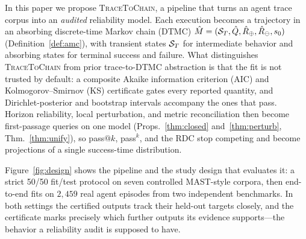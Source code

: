 In this paper we propose \textsc{TraceToChain}, a pipeline that turns an
agent trace corpus into an \emph{audited} reliability model. Each
execution becomes a trajectory in an absorbing discrete-time Markov
chain (DTMC) $\hat M=(\mathcal{S}_T,\hat Q,\hat R_\oplus,\hat R_\ominus,s_0)$
(Definition~\ref{def:amc}), with transient states $\mathcal{S}_T$ for
intermediate behavior and absorbing states for terminal success and
failure. What distinguishes \textsc{TraceToChain}
from prior trace-to-DTMC abstraction is that the fit is not trusted by
default: a composite Akaike information criterion (AIC) and
Kolmogorov--Smirnov (KS) certificate gates every reported quantity, and
Dirichlet-posterior and bootstrap intervals accompany the ones that
pass. Horizon reliability, local perturbation, and metric
reconciliation then become first-passage queries on one model
(Props.~\ref{thm:closed} and~\ref{thm:perturb}, Thm.~\ref{thm:unify}),
so pass$@k$, pass$^k$, and the RDC stop competing and become
projections of a single success-time distribution.

Figure~\ref{fig:design} shows the pipeline and the study design that
evaluates it: a strict 50/50 fit/test protocol on seven controlled
MAST-style corpora, then end-to-end fits on $2{,}459$ real agent
episodes from two independent benchmarks. In both settings the
certified outputs track their held-out targets closely, and the
certificate marks precisely which further outputs its evidence
supports---the behavior a reliability audit is supposed to have.

